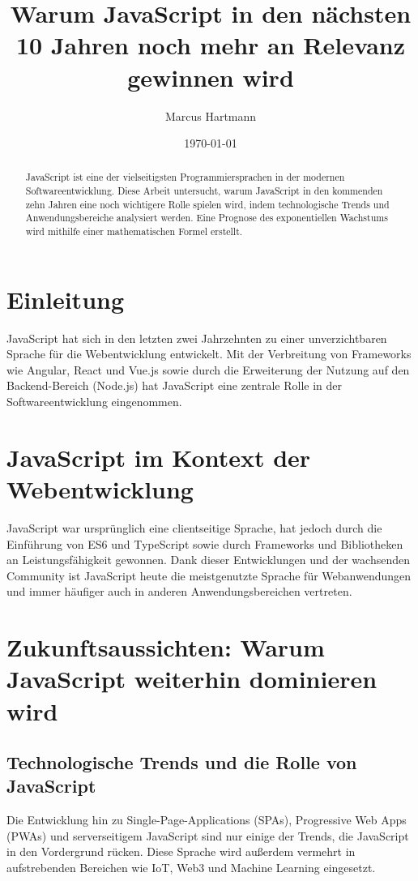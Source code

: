 \documentclass[a4paper,12pt]{article}
\title{Warum JavaScript in den nächsten 10 Jahren noch mehr an Relevanz gewinnen wird}
\author{Marcus Hartmann}
\date{\today}
\begin{document}
\maketitle

\begin{abstract}
JavaScript ist eine der vielseitigsten Programmiersprachen in der modernen Softwareentwicklung. Diese Arbeit untersucht, warum JavaScript in den kommenden zehn Jahren eine noch wichtigere Rolle spielen wird, indem technologische Trends und Anwendungsbereiche analysiert werden. Eine Prognose des exponentiellen Wachstums wird mithilfe einer mathematischen Formel erstellt.
\end{abstract}

\tableofcontents
\newpage

\section{Einleitung}
JavaScript hat sich in den letzten zwei Jahrzehnten zu einer unverzichtbaren Sprache für die Webentwicklung entwickelt. Mit der Verbreitung von Frameworks wie Angular, React und Vue.js sowie durch die Erweiterung der Nutzung auf den Backend-Bereich (Node.js) hat JavaScript eine zentrale Rolle in der Softwareentwicklung eingenommen.

\section{JavaScript im Kontext der Webentwicklung}
JavaScript war ursprünglich eine clientseitige Sprache, hat jedoch durch die Einführung von ES6 und TypeScript sowie durch Frameworks und Bibliotheken an Leistungsfähigkeit gewonnen. Dank dieser Entwicklungen und der wachsenden Community ist JavaScript heute die meistgenutzte Sprache für Webanwendungen und immer häufiger auch in anderen Anwendungsbereichen vertreten.

\section{Zukunftsaussichten: Warum JavaScript weiterhin dominieren wird}
\subsection{Technologische Trends und die Rolle von JavaScript}
Die Entwicklung hin zu Single-Page-Applications (SPAs), Progressive Web Apps (PWAs) und serverseitigem JavaScript sind nur einige der Trends, die JavaScript in den Vordergrund rücken. Diese Sprache wird außerdem vermehrt in aufstrebenden Bereichen wie IoT, Web3 und Machine Learning eingesetzt.
\end{document}
